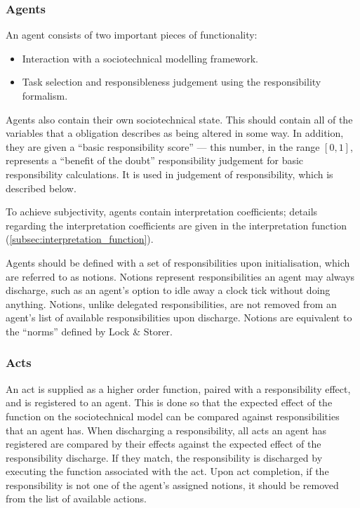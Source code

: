 \subsubsection{Agents}  %
An agent consists of two important pieces of functionality:

\begin{itemize}
    \item Interaction with a sociotechnical modelling framework.
    \item Task selection and responsibleness judgement using the responsibility formalism.
\end{itemize}

Agents also contain their own sociotechnical state. This should contain all of the variables that a obligation describes as being altered in some way. In addition, they are given a ``basic responsibility score'' --- this number, in the range \([0,1]\), represents a ``benefit of the doubt'' responsibility judgement for basic responsibility calculations. It is used in judgement of responsibility, which is described below.\par

To achieve subjectivity, agents contain interpretation coefficients; details regarding the interpretation coefficients are given in the interpretation function (\cref{subsec:interpretation_function}).\par

Agents should be defined with a set of responsibilities upon initialisation, which are referred to as notions. Notions represent responsibilities an agent may always discharge, such as an agent's option to idle away a clock tick without doing anything. Notions, unlike delegated responsibilities, are not removed from an agent's list of available responsibilities upon discharge. Notions are equivalent to the ``norms'' defined by Lock \& Storer\cite{storer2008modelling}.\par

\subsubsection{Acts}
An act is supplied as a higher order function, paired with a responsibility effect, and is registered to an agent. This is done so that the expected effect of the function on the sociotechnical model can be compared against responsibilities that an agent has. When discharging a responsibility, all acts an agent has registered are compared by their effects against the expected effect of the responsibility discharge. If they match, the responsibility is discharged by executing the function associated with the act. Upon act completion, if the responsibility is not one of the agent's assigned notions, it should be removed from the list of available actions.\par

